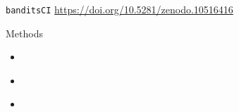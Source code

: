 \documentclass[xcolor={table}]{beamer}
\begin{document}
\note{
\scriptsize \singlespacing

}
\begin{frame}[label = map]

\begin{wideitemize}
\item \texttt{banditsCI} \url{https://doi.org/10.5281/zenodo.10516416}
\item Methods
\begin{itemize}
\item \hyperlink{ts}{}
\item \hyperlink{debias}{}
\item \hyperlink{contextualrecs}{}
\end{itemize}
\end{wideitemize}

\end{frame}
\begin{frame}


\end{frame}
\algrenewcommand{}
\end{document}
